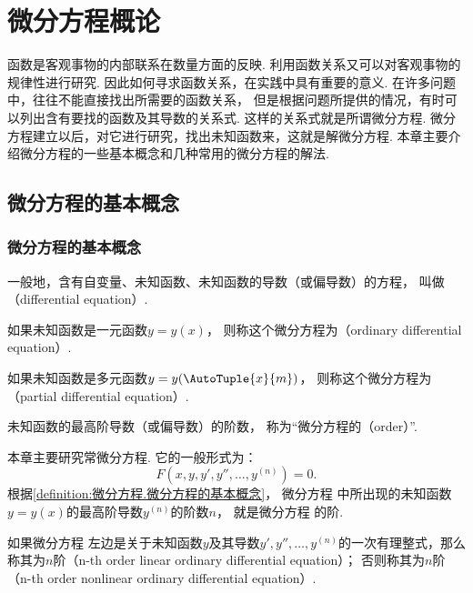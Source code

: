 \chapter{微分方程概论}
函数是客观事物的内部联系在数量方面的反映.
利用函数关系又可以对客观事物的规律性进行研究.
因此如何寻求函数关系，在实践中具有重要的意义.
在许多问题中，往往不能直接找出所需要的函数关系，
但是根据问题所提供的情况，有时可以列出含有要找的函数及其导数的关系式.
这样的关系式就是所谓微分方程.
微分方程建立以后，对它进行研究，找出未知函数来，这就是解微分方程.
本章主要介绍微分方程的一些基本概念和几种常用的微分方程的解法.

\section{微分方程的基本概念}
\subsection{微分方程的基本概念}
\begin{definition}\label{definition:微分方程.微分方程的基本概念}
一般地，含有自变量、未知函数、未知函数的导数（或偏导数）的方程，
叫做（differential equation）.

如果未知函数是一元函数\(y = y(x)\)，
则称这个微分方程为（ordinary differential equation）.

如果未知函数是多元函数\(y = y(\AutoTuple{x}{m})\)，
则称这个微分方程为（partial differential equation）.

未知函数的最高阶导数（或偏导数）的阶数，
称为“微分方程的（order）”.
\end{definition}

本章主要研究常微分方程.
它的一般形式为：
\begin{equation}\label{equation:微分方程.微分方程的一般形式}
F\left( x,y,y',y'',\dotsc,y^{(n)} \right)=0.
\end{equation}
根据\cref{definition:微分方程.微分方程的基本概念}，
微分方程  中所出现的未知函数
\(y = y(x)\)的最高阶导数\(y^{(n)}\)的阶数\(n\)，
就是微分方程  的阶.

如果微分方程  左边是关于未知函数\(y\)及其导数\(y',y'',\dotsc,y^{(n)}\)的一次有理整式，那么称其为\(n\)阶（n-th order linear ordinary differential equation）；
否则称其为\(n\)阶（n-th order nonlinear ordinary differential equation）.


